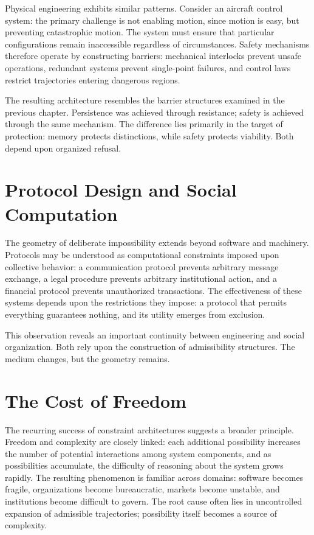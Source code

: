 \documentclass[11pt,oneside]{book}
\theoremstyle{plain}
\theoremstyle{definition}
\theoremstyle{remark}
\begin{document}
Physical engineering exhibits similar patterns. Consider an aircraft control system: the primary challenge is not enabling motion, since motion is easy, but preventing catastrophic motion. The system must ensure that particular configurations remain inaccessible regardless of circumstances. Safety mechanisms therefore operate by constructing barriers: mechanical interlocks prevent unsafe operations, redundant systems prevent single-point failures, and control laws restrict trajectories entering dangerous regions.

The resulting architecture resembles the barrier structures examined in the previous chapter. Persistence was achieved through resistance; safety is achieved through the same mechanism. The difference lies primarily in the target of protection: memory protects distinctions, while safety protects viability. Both depend upon organized refusal.

\section{Protocol Design and Social Computation}

The geometry of deliberate impossibility extends beyond software and machinery. Protocols may be understood as computational constraints imposed upon collective behavior: a communication protocol prevents arbitrary message exchange, a legal procedure prevents arbitrary institutional action, and a financial protocol prevents unauthorized transactions. The effectiveness of these systems depends upon the restrictions they impose: a protocol that permits everything guarantees nothing, and its utility emerges from exclusion.

This observation reveals an important continuity between engineering and social organization. Both rely upon the construction of admissibility structures. The medium changes, but the geometry remains.

\section{The Cost of Freedom}

The recurring success of constraint architectures suggests a broader principle. Freedom and complexity are closely linked: each additional possibility increases the number of potential interactions among system components, and as possibilities accumulate, the difficulty of reasoning about the system grows rapidly. The resulting phenomenon is familiar across domains: software becomes fragile, organizations become bureaucratic, markets become unstable, and institutions become difficult to govern. The root cause often lies in uncontrolled expansion of admissible trajectories; possibility itself becomes a source of complexity.
\end{document}
